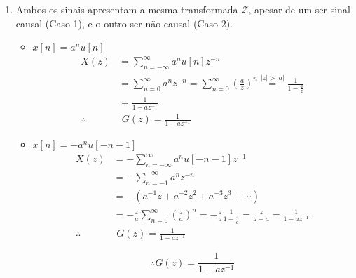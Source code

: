 \documentclass[twoside, fleqn]{article}
\begin{document}
\begin{enumerate}
        \item %
        
        Ambos os sinais apresentam a mesma transformada $\mathcal{Z}$, apesar de um ser sinal causal (Caso 1), e o outro ser não-causal (Caso 2).
        
            \begin{itemize}
                \item $x[n] = a^n u[n]$
                    \begin{equation}
                        \begin{split}
                            X(z) &= \sum_{n = -\infty}^{\infty} a^n u[n] z^{-n} \\
                            & = \sum_{n 
                            = 0}^{\infty} a^n z^{-n} = \sum_{n = 0}^{\infty} (\frac{a}{z})^n \stackrel{|z| > |a|}{=} \frac{1}{1 - \frac{a}{z}} \\
                            &= \frac{1}{1 - a z^{-1}} \\
                            \therefore & \,\, G(z) = \frac{1}{1 - a z^{-1}}
                        \end{split}
                    \end{equation}
                
                \item $x[n] = -a^n u[-n-1]$
                    \begin{equation}
                        \begin{split}
                            X(z) &= - \sum_{n = - \infty}^{\infty} a^n u[-n - 1] z^{-1} \\
                            &= - \sum_{n = -1}^{-\infty} a^n z^{-n} \\
                            &= -\left(a^{-1}z + a^{-2} z^2 + a^{-3} z^3 + \cdots\right) \\
                            &= -\frac{z}{a} \sum_{n = 0}^{\infty} (\frac{z}{a})^n = - \frac{z}{a} \frac{1}{1 - \frac{z}{a}} = \frac{z}{z-a} = \frac{1}{1 - a z^{-1}} \\
                            \therefore & \,\, G(z) = \frac{1}{1 - a z^{-1}}
                        \end{split}
                    \end{equation}
                    
                    \begin{equation}
                        \therefore G(z) = \frac{1}{1 - a z^{-1}}
                    \end{equation}
            \end{itemize}
        \end{enumerate}
    
\end{document}
